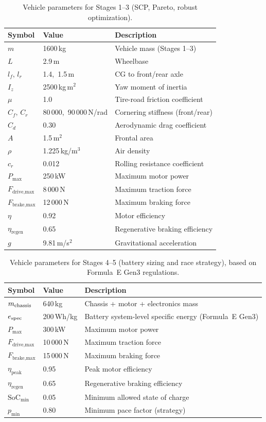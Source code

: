 \documentclass[conf]{new-aiaa}
\begin{document}
\begin{table}[h!]
\centering
\small
\begin{tabular}{lll}
\toprule
Symbol & Value & Description \\
\midrule
$m$ & 1600\,kg & Vehicle mass (Stages 1--3) \\
$L$ & 2.9\,m & Wheelbase \\
$l_f,\, l_r$ & 1.4,\, 1.5\,m & CG to front/rear axle \\
$I_z$ & 2500\,kg\,m$^2$ & Yaw moment of inertia \\
$\mu$ & 1.0 & Tire-road friction coefficient \\
$C_f,\, C_r$ & 80\,000,\, 90\,000\,N/rad & Cornering stiffness (front/rear) \\
$C_d$ & 0.30 & Aerodynamic drag coefficient \\
$A$ & 1.5\,m$^2$ & Frontal area \\
$\rho$ & 1.225\,kg/m$^3$ & Air density \\
$c_r$ & 0.012 & Rolling resistance coefficient \\
$P_{\max}$ & 250\,kW & Maximum motor power \\
$F_{\text{drive,max}}$ & 8\,000\,N & Maximum traction force \\
$F_{\text{brake,max}}$ & 12\,000\,N & Maximum braking force \\
$\eta$ & 0.92 & Motor efficiency \\
$\eta_{\text{regen}}$ & 0.65 & Regenerative braking efficiency \\
$g$ & 9.81\,m/s$^2$ & Gravitational acceleration \\
\bottomrule
\end{tabular}
\caption{Vehicle parameters for Stages 1--3 (SCP, Pareto, robust optimization).}
\end{table}

\begin{table}[h!]
\centering
\small
%
\begin{tabular}{lll}
\toprule
Symbol & Value & Description \\
\midrule
$m_{\rm chassis}$ & 640\,kg & Chassis + motor + electronics mass \\
$e_{\rm spec}$ & 200\,Wh/kg & Battery system-level specific energy (Formula~E Gen3) \\
$P_{\max}$ & 300\,kW & Maximum motor power \\
$F_{\text{drive,max}}$ & 10\,000\,N & Maximum traction force \\
$F_{\text{brake,max}}$ & 15\,000\,N & Maximum braking force \\
$\eta_{\text{peak}}$ & 0.95 & Peak motor efficiency \\
$\eta_{\text{regen}}$ & 0.65 & Regenerative braking efficiency \\
$\mathrm{SoC}_{\min}$ & 0.05 & Minimum allowed state of charge \\
$p_{\min}$ & 0.80 & Minimum pace factor (strategy) \\
\bottomrule
\end{tabular}
\caption{Vehicle parameters for Stages 4--5 (battery sizing and race strategy), based on Formula~E Gen3 regulations.}

\end{table}
\end{document}
